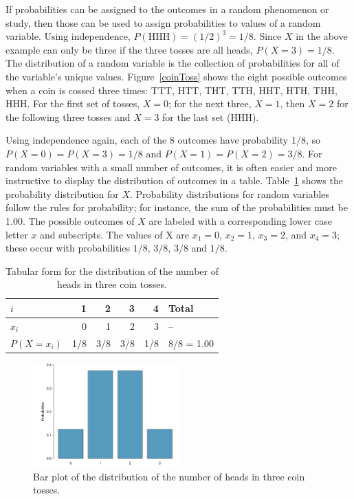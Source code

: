 If probabilities can be assigned to the outcomes in a random phenomenon or study, then those can be used to assign probabilities to values of a random variable.  Using independence, $P(\text{HHH}) = (1/2)^3 = 1/8$.  Since $X$ in the above example can only be three if the three tosses are all heads, $P(X=3) = 1/8$.  The distribution of a random variable is the collection of probabilities for all of the variable's unique values. Figure~\ref{coinToss} shows the eight possible outcomes when a coin is cossed three times: TTT, HTT, THT, TTH, HHT, HTH, THH, HHH. For the first set of tosses, $X = 0$; for the next three, $X=1$, then $X=2$ for the following three tosses and $X=3$ for the last set (HHH).  

Using independence again, each of the 8 outcomes have probability 1/8, so $P(X = 0) = P(X = 3) = 1/8$ and $P(X = 1) = P(X = 2) = 3/8$. For random variables with a small number of outcomes, it is often easier and more instructive to display the distribution of outcomes in a table. Table~\ref{distCoinTossing} shows the probability distribution for $X$.  Probability distributions for random variables follow the rules for probability; for instance, the sum of the probabilities must be 1.00.  The possible outcomes of $X$ are labeled with a corresponding lower case letter $x$ and subscripts.  The values of X are $x_1=0$, $x_2=1$,  $x_3 = 2$, and $x_4 = 3$; these occur with probabilities $1/8$, $3/8$, $3/8$ and $1/8$.

\begin{table}[h]
	\centering 
	\begin{tabular}{l rrrr l}
		\hline 
		$i$ & 1 & 2 & 3 & 4 & Total\\
		\hline
		$x_i$ & 0 & 1 & 2 & 3 & --\\
		$P(X = x_i)$ & 1/8 & 3/8 & 3/8 & 1/8 & 8/8 = 1.00\\
	\end{tabular}
	\caption{Tabular form for the distribution of the number of heads in three coin tosses.}
	\label{distCoinTossing}
\end{table}

\begin{figure}[h]
\centering
\includegraphics[width=0.5\textwidth]
{ch_probability_oi_biostat/figures/barPlotCoinTossing/barPlotCoinTossing.pdf}
\caption{Bar plot of the distribution of the number of heads in three coin tosses.}
\label{barPlotCoinTossing}
\end{figure}


